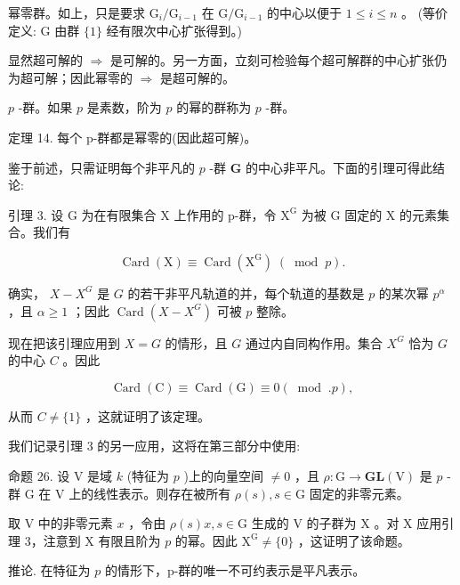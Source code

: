 \documentclass[10pt]{article}
\begin{document}
幂零群。如上，只是要求 \({\mathrm{G}}_{i}/{\mathrm{G}}_{i - 1}\) 在 \(\mathrm{G}/{\mathrm{G}}_{i - 1}\) 的中心以便于 \(1 \leq  i \leq  n\) 。 (等价定义: \(\mathrm{G}\) 由群 \(\{ 1\}\) 经有限次中心扩张得到。)

显然超可解的 \(\Rightarrow\) 是可解的。另一方面，立刻可检验每个超可解群的中心扩张仍为超可解；因此幂零的 \(\Rightarrow\) 是超可解的。

\(p\) -群。如果 \(p\) 是素数，阶为 \(p\) 的幂的群称为 \(p\) -群。

定理 14. 每个 p-群都是幂零的(因此超可解)。

鉴于前述，只需证明每个非平凡的 \(p\) -群 \(\mathbf{G}\) 的中心非平凡。下面的引理可得此结论:

引理 3. 设 \(\mathrm{G}\) 为在有限集合 \(\mathrm{X}\) 上作用的 p-群，令 \({\mathrm{X}}^{\mathrm{G}}\) 为被 \(\mathrm{G}\) 固定的 \(\mathrm{X}\) 的元素集合。我们有

\[
\operatorname{Card}\left( \mathrm{X}\right)  \equiv  \operatorname{Card}\left( {\mathrm{X}}^{\mathrm{G}}\right) \;\left( {\;\operatorname{mod}\;p}\right) .
\]

确实， \(X - {X}^{G}\) 是 \(G\) 的若干非平凡轨道的并，每个轨道的基数是 \(p\) 的某次幂 \({p}^{\alpha }\) ，且 \(\alpha  \geq  1\) ；因此 \(\operatorname{Card}\left( {X - {X}^{G}}\right)\) 可被 \(p\) 整除。

现在把该引理应用到 \(X = G\) 的情形，且 \(G\) 通过内自同构作用。集合 \({X}^{G}\) 恰为 \(G\) 的中心 \(C\) 。因此

\[
\operatorname{Card}\left( \mathrm{C}\right)  \equiv  \operatorname{Card}\left( \mathrm{G}\right)  \equiv  0\left( {\;\operatorname{mod}\;.p}\right) ,
\]

从而 \(C \neq  \{ 1\}\) ，这就证明了该定理。

我们记录引理 3 的另一应用，这将在第三部分中使用:

命题 26. 设 \(\mathrm{V}\) 是域 \(k\) (特征为 \(p\) )上的向量空间 \(\neq  0\) ，且 \(\rho  : \mathrm{G} \rightarrow  \mathbf{{GL}}\left( \mathrm{V}\right)\) 是 \(p\) -群 \(\mathrm{G}\) 在 \(\mathrm{V}\) 上的线性表示。则存在被所有 \(\rho \left( s\right) ,s \in  \mathrm{G}\) 固定的非零元素。

取 \(\mathrm{V}\) 中的非零元素 \(x\) ，令由 \(\rho \left( s\right) x,s \in  \mathrm{G}\) 生成的 \(\mathrm{V}\) 的子群为 \(\mathrm{X}\) 。对 \(\mathrm{X}\) 应用引理 3，注意到 \(\mathrm{X}\) 有限且阶为 \(p\) 的幂。因此 \({\mathrm{X}}^{\mathrm{G}} \neq  \{ 0\}\) ，这证明了该命题。

推论. 在特征为 \(p\) 的情形下，p-群的唯一不可约表示是平凡表示。
\end{document}
